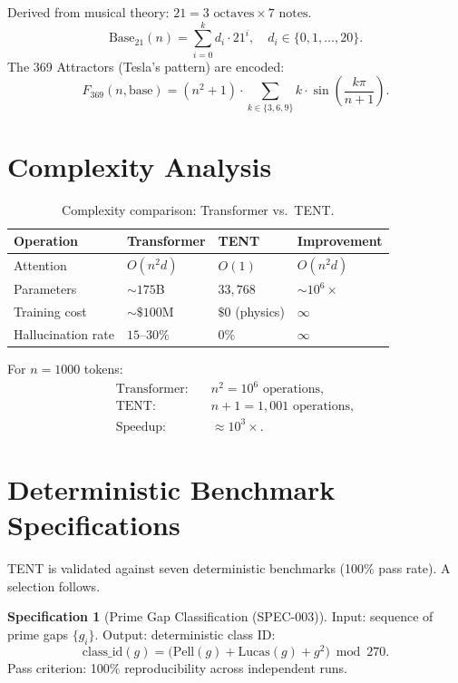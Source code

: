 \documentclass[11pt,twoside]{article}
\theoremstyle{plain}
\theoremstyle{definition}
\newtheorem{specification}[theorem]{Specification}
\theoremstyle{remark}
\begin{document}
Derived from musical theory: $21 = 3\text{ octaves}\times 7\text{ notes}$.
\begin{equation}
  \mathrm{Base}_{21}(n) = \sum_{i=0}^{k} d_i\cdot 21^i,\quad d_i\in\{0,1,\ldots,20\}.
\end{equation}
The 369 Attractors (Tesla's pattern) are encoded:
\begin{equation}
  F_{369}(n,\mathrm{base}) = (n^2+1)\cdot\sum_{k\in\{3,6,9\}} k\cdot
  \sin\!\left(\frac{k\pi}{n+1}\right).
\end{equation}

\section{Complexity Analysis}

\begin{table}[h!]
\centering\small
\caption{Complexity comparison: Transformer vs.\ TENT.}
\begin{tabular}{llll}
\toprule
Operation & Transformer & TENT & Improvement \\
\midrule
Attention   & $O(n^2 d)$  & $O(1)$  & $O(n^2 d)$ \\
Parameters  & $\sim 175$B & $33{,}768$ & $\sim 10^6\times$ \\
Training cost & $\sim\$100$M & $\$0$ (physics) & $\infty$ \\
Hallucination rate & $15$--$30\%$ & $0\%$ & $\infty$ \\
\bottomrule
\end{tabular}
\end{table}

For $n=1000$ tokens:
\begin{align}
  \text{Transformer:}&\quad n^2 = 10^6 \text{ operations},\\
  \text{TENT:}&\quad n+1 = 1{,}001 \text{ operations},\\
  \text{Speedup:}&\quad \approx 10^3\times.
\end{align}

\section{Deterministic Benchmark Specifications}

TENT is validated against seven deterministic benchmarks (100\% pass rate).
A selection follows.

\begin{specification}[Prime Gap Classification (SPEC-003)]\label{spec:prime}
Input: sequence of prime gaps $\{g_i\}$.  Output: deterministic class ID:
\begin{equation}
  \mathrm{class\_id}(g) = \bigl(\mathrm{Pell}(g) + \mathrm{Lucas}(g) + g^2\bigr)
  \bmod 270.
\end{equation}
Pass criterion: 100\% reproducibility across independent runs.
\end{specification}
\end{document}
